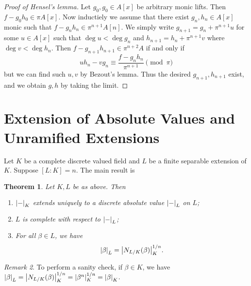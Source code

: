 \documentclass[leqno, openany]{memoir}
\newtheorem{thm}{Theorem}[section]
\theoremstyle{definition}
\theoremstyle{remark}
\newtheorem{rmk}[thm]{Remark}
\theoremstyle{plain}
\theoremstyle{definition}
\theoremstyle{remark}
\begin{document}
\begin{proof}[Proof of Hensel's lemma] Let $g_0, g_0 \in A[x]$ be arbitrary
    monic lifts. Then $f - g_0 h_0 \in \pi A[x]$. Now inductiely we assume that
    there exist $g_n, h_n \in A[x]$ monic such that $f - g_n h_n \in \pi^{n+1}
    A[n]$. We simply write $g_{n+1} = g_n + \pi^{n+1} u$ for some $u \in A[x]$
    such that $\deg u < \deg g_n$ and $h_{n+1} = h_n + \pi^{n+1} v$ where $\deg
    v < \deg h_n$. Then $f - g_{n+1} h_{n+1} \in \pi^{n+2} A$ if and only if \[
    u h_n - v g_n \equiv \frac{f - g_n h_n}{\pi^{n+1}} \pmod \pi \] but we can
    find such $u,v$ by Bezout's lemma. Thus the desired $g_{n+1}, h_{n+1}$
    exist, and we obtain $g,h$ by taking the limit.  \end{proof}

\section{Extension of Absolute Values and Unramified Extensions}%
\label{sec:extension_of_absolute_values_and_unramified_extensions}

Let $K$ be a complete discrete valued field and $L$ be a finite separable
extension of $K$. Suppose $[L:K] = n$. The main result is

\begin{thm} Let $K,L$ be as above. Then \begin{enumerate} \item $\abs{-}_K$
    extends uniquely to a discrete absolute value $\abs{-}_L$ on $L$; \item $L$
    is complete with respect to $\abs{-}_L$; \item For all $\beta \in L$, we
    have \[ \abs{\beta}_L = \abs{N_{L/K}(\beta)}_K^{1/n}. \] \end{enumerate}
\end{thm}

\begin{rmk} To perform a sanity check, if $\beta \in K$, we have $\abs{\beta}_L
= \abs{N_{L/K}(\beta)}_K^{1/n} = \abs{\beta^n}_K^{1/n} = \abs{\beta}_K$.
\end{rmk}
\end{document}
